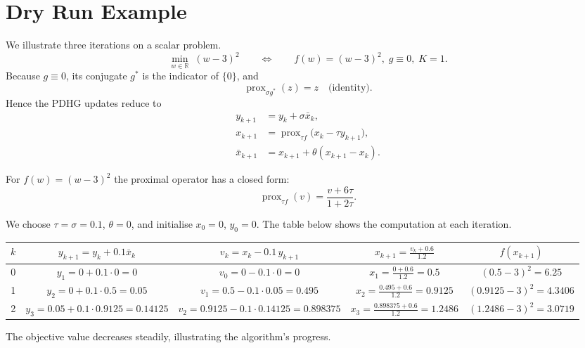\documentclass{article}
\newcommand{\prox}{\operatorname{prox}}
\begin{document}
\section*{Dry Run Example}
We illustrate three iterations on a scalar problem.
\[
\min_{w\in\mathbb R}\;(w-3)^{2}\qquad\Longleftrightarrow\qquad 
f(w)=(w-3)^{2},\; g\equiv0,\;K=1.
\]
Because $g\equiv0$, its conjugate $g^{*}$ is the indicator of $\{0\}$, and
\[
\prox_{\sigma g^{*}}(z)=z\quad\text{(identity)}.
\]
Hence the PDHG updates reduce to
\[
\begin{aligned}
y_{k+1}&=y_{k}+\sigma \bar x_{k},\\[2pt]
x_{k+1}&=\prox_{\tau f}\!\bigl(x_{k}-\tau y_{k+1}\bigr),\\[2pt]
\bar x_{k+1}&=x_{k+1}+\theta(x_{k+1}-x_{k}).
\end{aligned}
\]

For $f(w)=(w-3)^{2}$ the proximal operator has a closed form:
\[
\prox_{\tau f}(v)=\frac{v+6\tau}{1+2\tau}.
\tag{2}
\]

We choose $\tau=\sigma=0.1$, $\theta=0$, and initialise $x_{0}=0$, $y_{0}=0$.
The table below shows the computation at each iteration.

\begin{center}
\begin{tabular}{c|c|c|c|c}
$k$ & $y_{k+1}=y_{k}+0.1\bar x_{k}$ &
$v_{k}=x_{k}-0.1\,y_{k+1}$ &
$x_{k+1}=\displaystyle\frac{v_{k}+0.6}{1.2}$ &
$f(x_{k+1})$\\ \hline
0 & $y_{1}=0+0.1\cdot0=0$ &
$v_{0}=0-0.1\cdot0=0$ &
$x_{1}= \frac{0+0.6}{1.2}=0.5$ &
$(0.5-3)^{2}=6.25$\\[4pt]
1 & $y_{2}=0+0.1\cdot0.5=0.05$ &
$v_{1}=0.5-0.1\cdot0.05=0.495$ &
$x_{2}= \frac{0.495+0.6}{1.2}=0.9125$ &
$(0.9125-3)^{2}=4.3406$\\[4pt]
2 & $y_{3}=0.05+0.1\cdot0.9125=0.14125$ &
$v_{2}=0.9125-0.1\cdot0.14125=0.898375$ &
$x_{3}= \frac{0.898375+0.6}{1.2}=1.2486$ &
$(1.2486-3)^{2}=3.0719$
\end{tabular}
\end{center}
The objective value decreases steadily, illustrating the algorithm’s progress.
\end{document}
